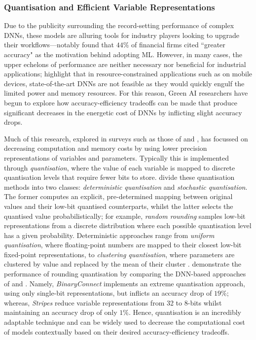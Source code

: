 \documentclass[a4paper, 11pt]{report}
\begin{document}
    \subsubsection{Quantisation and Efficient Variable Representations}

    Due to the publicity surrounding the record-setting performance of complex DNNs, these models are alluring tools for industry players looking to upgrade their workflows—notably \citet{chartis-2019} found that $44\%$ of financial firms cited ``greater accuracy" as the motivation behind adopting ML. However, in many cases, the upper echelons of performance are neither necessary nor beneficial for industrial applications; \citet{kumar-2020} highlight that in resource-constrained applications such as on mobile devices, state-of-the-art DNNs are not feasible as they would quickly engulf the limited power and memory resources. For this reason, Green AI researchers have begun to explore how accuracy-efficiency tradeoffs can be made that produce significant decreases in the energetic cost of DNNs by inflicting slight accuracy drops.

    Much of this research, explored in surveys such as those of \citet{xu-2021} and \citet{cai-2022}, has focussed on decreasing computation and memory costs by using lower precision representations of variables and parameters. Typically this is implemented through \emph{quantisation}, where the value of each variable is mapped to discrete quantisation levels that require fewer bits to store. \citet{xu-2021} divide these quantisation methods into two classes: \emph{deterministic quantisation} and \emph{stochastic quantisation}. The former computes an explicit, pre-determined mapping between original values and their low-bit quantised counterparts, whilst the latter selects the quantised value probabilistically; for example, \emph{random rounding} samples low-bit representations from a discrete distribution where each possible quantisation level has a given probability. Deterministic approaches range from \emph{uniform quantisation}, where floating-point numbers are mapped to their closest low-bit fixed-point representations, to \emph{clustering quantisation}, where parameters are clustered by value and replaced by the mean of their cluster \citep{xu-2021}. \citet{kumar-2020} demonstrate the performance of rounding quantisation by comparing the DNN-based approaches of \citet{courbariaux-2015} and \citet{judd-2016}. Namely, \emph{BinaryConnect} \citep{courbariaux-2015} implements an extreme quantisation approach, using only single-bit representations, but inflicts an accuracy drop of $19\%$; whereas, \emph{Stripes} \citep{judd-2016} reduce variable representations from 32 to 8-bits whilst maintaining an accuracy drop of only $1\%$. Hence, quantisation is an incredibly adaptable technique and can be widely used to decrease the computational cost of models contextually based on their desired accuracy-efficiency tradeoffs.
\end{document}
